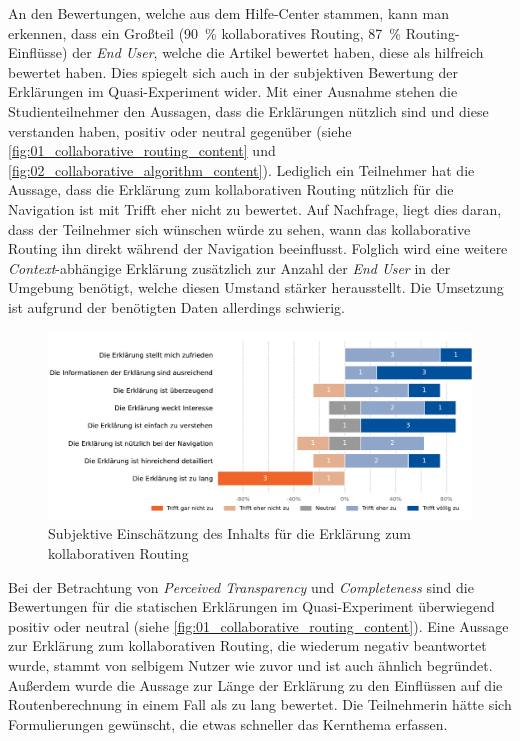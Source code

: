 An den Bewertungen, welche aus dem Hilfe-Center stammen, kann man erkennen, dass ein Großteil (90~\% kollaboratives Routing, 87~\% Routing-Einflüsse) der \textit{End User}, welche die Artikel bewertet haben, diese als \glqq hilfreich\grqq{} bewertet haben. Dies spiegelt sich auch in der subjektiven Bewertung der Erklärungen im Quasi-Experiment wider. Mit einer Ausnahme stehen die Studienteilnehmer den Aussagen, dass die Erklärungen nützlich sind und diese verstanden haben, positiv oder neutral gegenüber (siehe \autoref{fig:01_collaborative_routing_content} und \autoref{fig:02_collaborative_algorithm_content}). Lediglich ein Teilnehmer hat die Aussage, dass die Erklärung zum kollaborativen Routing nützlich für die Navigation ist mit \glqq Trifft eher nicht zu\grqq{} bewertet. Auf Nachfrage, liegt dies daran, dass der Teilnehmer sich wünschen würde zu sehen, wann das kollaborative Routing ihn direkt während der Navigation beeinflusst. Folglich wird eine weitere \textit{Context}-abhängige Erklärung zusätzlich zur Anzahl der \textit{End User} in der Umgebung benötigt, welche diesen Umstand stärker herausstellt. Die Umsetzung ist aufgrund der benötigten Daten allerdings schwierig.

\begin{figure}[htb!]
    \centering
    \includegraphics[width=\textwidth]{contents/06_model_evaluation/02_evaluation/res/qualitativeFeedback-01_collaborative_routing_content.pdf}
    \caption{Subjektive Einschätzung des Inhalts für die Erklärung zum kollaborativen Routing}
    \label{fig:01_collaborative_routing_content}
\end{figure}

Bei der Betrachtung von \textit{Perceived Transparency} und \textit{Completeness} sind die Bewertungen für die statischen Erklärungen im Quasi-Experiment überwiegend positiv oder neutral (siehe \autoref{fig:01_collaborative_routing_content}). Eine Aussage zur Erklärung zum kollaborativen Routing, die wiederum negativ beantwortet wurde, stammt von selbigem Nutzer wie zuvor und ist auch ähnlich begründet. Außerdem wurde die Aussage zur Länge der Erklärung zu den Einflüssen auf die Routenberechnung in einem Fall als zu lang bewertet. Die Teilnehmerin hätte sich Formulierungen gewünscht, die etwas schneller das Kernthema erfassen.


